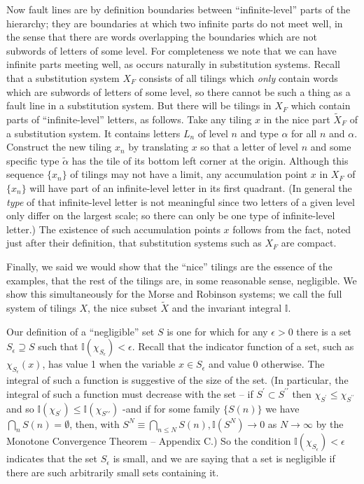 \documentclass[reqno]{stml-l}
\theoremstyle{plain}
\theoremstyle{definition}
\numberwithin{equation}{chapter}
\begin{document}
Now fault lines are by definition boundaries between ``infinite-level'' parts of the hierarchy; they are boundaries at which two infinite parts do not meet well, in the sense that there are words overlapping the boundaries which are not subwords of letters of some level. For completeness we note that we can have infinite parts meeting well, as occurs naturally in substitution systems. Recall that a substitution system $X_{F}$ consists of all tilings which \emph{only} contain words which are
subwords of letters of some level, so there cannot be such a thing as a fault line in a substitution system. But there will be tilings in $X_{F}$ which contain parts of ``infinite-level'' letters, as follows. Take any tiling $x$ in the nice part $\tilde{X}_{F}$ of a substitution system. It contains letters $L_{n}$ of level $n$ and type $\alpha$ for all $n$ and $\alpha$. Construct the new tiling $x_{n}$ by translating $x$ so that a letter of level $n$ and some specific type $\tilde{\alpha}$ has the tile of its bottom left corner at the origin. Although this sequence $\{x_{n}\}$ of tilings may not have a limit, any accumulation point $x$ in $X_{F}$ of $\{x_{n}\}$ will have part of an infinite-level letter in its first quadrant. (In general the \emph{type} of that infinite-level letter is not meaningful since two letters of a given level only differ on the largest scale; so there can only be one type of infinite-level letter.) The existence of such accumulation points $x$ follows from the fact, noted just after their definition, that substitution systems such as $X_{F}$ are compact.

Finally, we said we would show that the ``nice'' tilings are the essence of the examples, that the rest of the tilings are, in some reasonable sense, negligible. We show this simultaneously for the Morse and Robinson systems; we call the full system of tilings $X$, the nice subset $\tilde{X}$ and the invariant integral $\mathbb{I}$.

Our definition of a ``negligible'' set $S$ is one for which for any $\epsilon>0$ there is a set $S_{\epsilon}\supseteq S$ such that $\mathbb{I}(\chi_{S_{\epsilon}})<\epsilon$. Recall that the indicator function of a set, such as $\chi_{S_{\epsilon}}(x)$, has value 1 when the variable $x\in S_{\epsilon}$ and value 0 otherwise. The integral of such a function is suggestive of the size of the set. (In particular, the integral of such a function must decrease with the set --
if $S^{\prime}\subset S^{\prime\prime}$ then $\chi_{S^{\prime}}\leq\chi_{S^{\prime\prime}}$ and so $\mathbb{I}(\chi_{S^{\prime}})\leq\mathbb{I}(\chi_{S{\prime\prime}})$ -and if for some family $\{S(n)\}$ we have $\bigcap_{n}S(n)=\emptyset$, then, with $S^{N}\equiv\bigcap_{n\leq N}S(n),\mathbb{I}(S^{N})\rightarrow 0$ as $N\rightarrow\infty$ by the Monotone Convergence Theorem -- Appendix C.) So the condition $\mathbb{I}(\chi_{S_{\epsilon}})<\epsilon$ indicates that
the set $S_{\epsilon}$ is small, and we are saying that a set is negligible if there are such arbitrarily small sets containing it.
\end{document}
